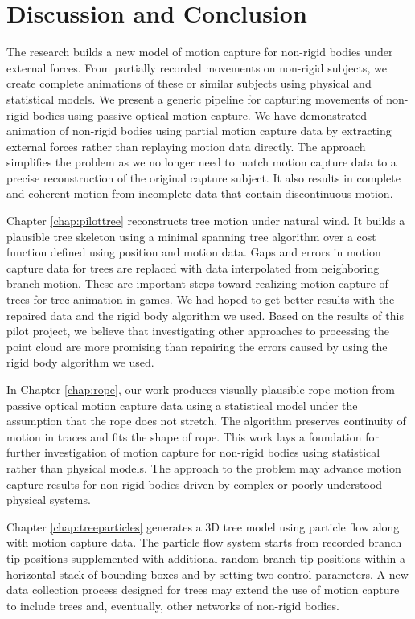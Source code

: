 \chapter{Discussion and Conclusion}

The research builds a new model of motion capture for non-rigid bodies under external forces. From partially recorded movements on non-rigid subjects, we create complete animations of these or similar subjects using physical and statistical models. We present a generic pipeline for capturing movements of non-rigid bodies using passive optical motion capture. We have demonstrated animation of non-rigid bodies using partial motion capture data by extracting external forces rather than replaying motion data directly. The approach simplifies the problem as we no longer need to match motion capture data to a precise reconstruction of the original capture subject. It also results in complete and coherent motion from incomplete data that contain discontinuous motion.

Chapter \ref{chap:pilottree} reconstructs tree motion under natural wind. It builds a plausible tree skeleton using a minimal spanning tree algorithm over a cost function defined using position and motion data. Gaps and errors in motion capture data for trees are replaced with data interpolated from neighboring branch motion. These are important steps toward realizing motion capture of trees for tree animation in games. We had hoped to get better results with the repaired data and the rigid body algorithm we used. Based on the results of this pilot project, we believe that investigating other approaches to processing the point cloud are more promising than repairing the errors caused by using the rigid body algorithm we used. 

In Chapter \ref{chap:rope}, our work produces visually plausible rope motion from passive optical motion capture data using a statistical model under the assumption that the rope does not stretch. The algorithm preserves continuity of motion in traces and fits the shape of rope.  This work lays a foundation for further investigation of motion capture for non-rigid bodies using statistical rather than physical models. The approach to the problem may advance motion capture results for non-rigid bodies driven by complex or poorly understood physical systems.

Chapter \ref{chap:treeparticles} generates a 3D tree model using particle flow along with motion capture data. The particle flow system starts from recorded branch tip positions supplemented with additional random branch tip positions within a horizontal stack of bounding boxes and by setting two control parameters. A new data collection process designed for trees may extend the use of motion capture to include trees and, eventually, other networks of non-rigid bodies. 

